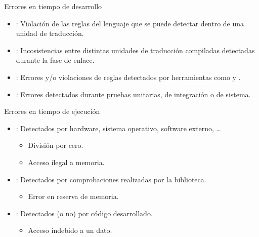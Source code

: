 \begin{frame}[t]{Errores en tiempo de desarrollo}
\begin{itemize}
  \item {}: 
        Violación de las reglas del lenguaje que
        se puede detectar dentro de una unidad de traducción.

  \item {}: 
        Incosistencias entre distintas unidades de 
        traducción compiladas detectadas durante la fase de enlace.

  \item {}:
        Errores y/o violaciones de reglas detectados por herramientas
        como  y
        .

  \item {}:
        Errores detectados durante pruebas unitarias, de integración
        o de sistema.
\end{itemize}
\end{frame}

\begin{frame}[t]{Errores en tiempo de ejecución}
\begin{itemize}
  \item {}: 
        Detectados por hardware, sistema operativo, software externo, \ldots
    \begin{itemize}
      \item División por cero.
      \item Acceso ilegal a memoria.
    \end{itemize}

  \item {}: 
        Detectados por comprobaciones realizadas por la biblioteca.
    \begin{itemize}
      \item Error en reserva de memoria.
    \end{itemize}

  \item {}: 
        Detectados (o no) por código desarrollado.
    \begin{itemize}
      \item Acceso indebido a un dato.
    \end{itemize}
\end{itemize}
\end{frame}

